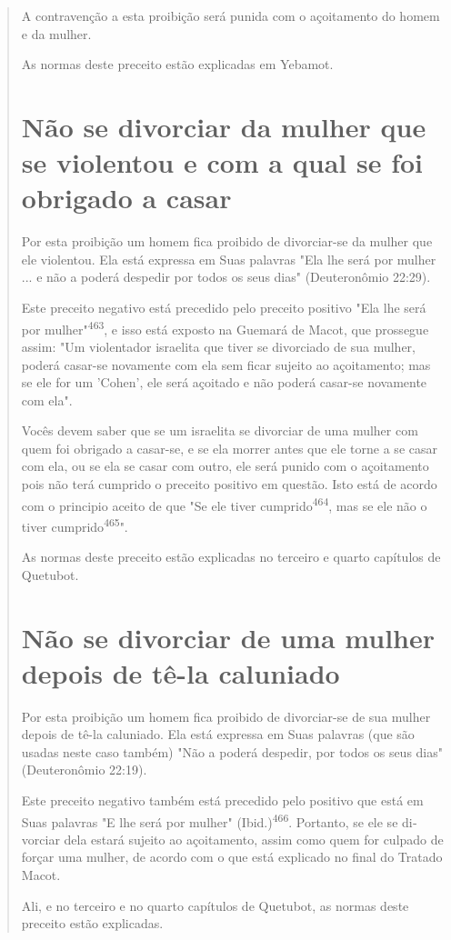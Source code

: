\begin{quote}

A contravenção a esta proibição será punida com o açoitamento do homem e
da mulher.

As normas deste preceito estão explicadas em Yebamot.

\section{Não se divorciar da mulher que se violentou e com a qual se foi
obrigado a casar}

Por esta proibição um homem fica proibido de divorciar-se da mu­lher que
ele violentou. Ela está expressa em Suas palavras "Ela lhe será por
mu­lher ... e não a poderá despedir por todos os seus dias"
(Deuteronômio 22:29).

Este preceito negativo está precedido pelo preceito positivo "Ela lhe
será por mulher"\textsuperscript{463}, e isso está exposto na Guemará de
Macot, que prossegue assim: "Um violentador israelita que tiver se
divorciado de sua mulher, poderá casar-se novamente com ela sem ficar
sujeito ao açoitamento; mas se ele for um 'Cohen', ele será açoitado e
não poderá casar-se novamente com ela".

Vocês devem saber que se um israelita se divorciar de uma mulher com
quem foi obrigado a casar-se, e se ela morrer antes que ele torne a se
casar com ela, ou se ela se casar com outro, ele será punido com o
açoitamento pois não terá cumprido o preceito positivo em questão. Isto
está de acordo com o principio aceito de que "Se ele tiver
cumprido\textsuperscript{464}, mas se ele não o tiver
cumprido\textsuperscript{465}".

As normas deste preceito estão explicadas no terceiro e quarto
capí­tulos de Quetubot.

\section{Não se divorciar de uma mulher depois de tê-la caluniado}

Por esta proibição um homem fica proibido de divorciar-se de sua mulher
depois de tê-la caluniado. Ela está expressa em Suas palavras (que são
usadas neste caso também) "Não a poderá despedir, por todos os seus
dias" (Deuteronômio 22:19).

Este preceito negativo também está precedido pelo positivo que es­tá em
Suas palavras "E lhe será por mulher" (Ibid.)\textsuperscript{466}.
Portanto, se ele se di­vorciar dela estará sujeito ao açoitamento, assim
como quem for culpado de forçar uma mulher, de acordo com o que está
explicado no final do Tratado Macot.

Ali, e no terceiro e no quarto capítulos de Quetubot, as normas des­te
preceito estão explicadas.
\end{quote}


